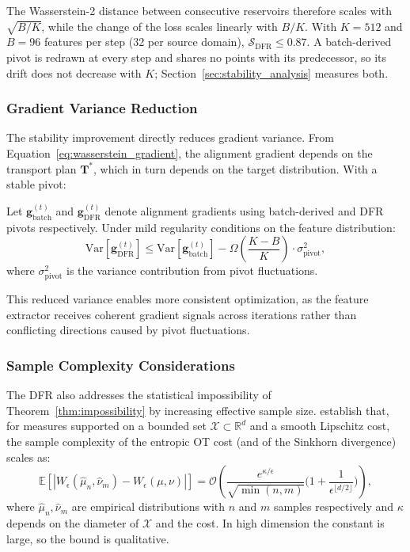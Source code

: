 The Wasserstein-2 distance between consecutive reservoirs therefore scales with $\sqrt{B/K}$, while the change of the loss scales linearly with $B/K$. With $K=512$ and $B=96$ features per step (32 per source domain), $\mathcal S_{\text{DFR}}\le0.87$. A batch-derived pivot is redrawn at every step and shares no points with its predecessor, so its drift does not decrease with $K$; Section~\ref{sec:stability_analysis} measures both.

\subsubsection{Gradient Variance Reduction}

The stability improvement directly reduces gradient variance. From Equation~\ref{eq:wasserstein_gradient}, the alignment gradient depends on the transport plan $\mathbf{T}^*$, which in turn depends on the target distribution. With a stable pivot:

\begin{proposition}
\label{prop:gradient_variance}
Let $\mathbf{g}_{\text{batch}}^{(t)}$ and $\mathbf{g}_{\text{DFR}}^{(t)}$ denote alignment gradients using batch-derived and DFR pivots respectively. Under mild regularity conditions on the feature distribution:
\begin{equation}
    \text{Var}\left[\mathbf{g}_{\text{DFR}}^{(t)}\right] \leq \text{Var}\left[\mathbf{g}_{\text{batch}}^{(t)}\right] - \Omega\left(\frac{K-B}{K}\right) \cdot \sigma^2_{\text{pivot}},
\end{equation}
where $\sigma^2_{\text{pivot}}$ is the variance contribution from pivot fluctuations.
\end{proposition}

This reduced variance enables more consistent optimization, as the feature extractor receives coherent gradient signals across iterations rather than conflicting directions caused by pivot fluctuations.

\subsubsection{Sample Complexity Considerations}

The DFR also addresses the statistical impossibility of Theorem~\ref{thm:impossibility} by increasing effective sample size. \citet{genevay2019sample} establish that, for measures supported on a bounded set $\mathcal X\subset\mathbb R^d$ and a smooth Lipschitz cost, the sample complexity of the entropic OT cost (and of the Sinkhorn divergence) scales as:
\begin{equation}
    \mathbb{E}\left[|W_\epsilon(\hat{\mu}_n, \hat{\nu}_m) - W_\epsilon(\mu, \nu)|\right] = \mathcal{O}\left(\frac{e^{\kappa/\epsilon}}{\sqrt{\min(n,m)}}\Big(1+\frac{1}{\epsilon^{\lfloor d/2\rfloor}}\Big)\right),
\end{equation}
where $\hat{\mu}_n, \hat{\nu}_m$ are empirical distributions with $n$ and $m$ samples respectively and $\kappa$ depends on the diameter of $\mathcal X$ and the cost. In high dimension the constant is large, so the bound is qualitative.

